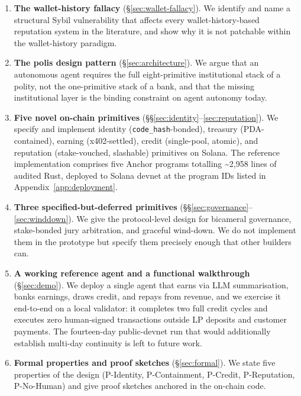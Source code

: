 \documentclass[10pt,conference,letterpaper]{IEEEtran}
\theoremstyle{definition}
\newcommand{\codehash}{\texttt{code\_hash}}
\begin{document}
\begin{enumerate}
\item \textbf{The wallet-history fallacy} (\S\ref{sec:wallet-fallacy}). We
identify and name a structural Sybil vulnerability that affects every
wallet-history-based reputation system in the literature, and show why
it is not patchable within the wallet-history paradigm.

\item \textbf{The polis design pattern} (\S\ref{sec:architecture}). We
argue that an autonomous agent requires the full eight-primitive
institutional stack of a polity, not the one-primitive stack of a bank,
and that the missing institutional layer is the binding constraint on
agent autonomy today.

\item \textbf{Five novel on-chain primitives}
(\S\S\ref{sec:identity}--\ref{sec:reputation}). We specify and
implement identity (\codehash{}-bonded), treasury (PDA-contained),
earning (x402-settled), credit (single-pool, atomic), and reputation
(stake-vouched, slashable) primitives on Solana. The reference
implementation comprises five Anchor programs totalling
\textasciitilde 2{,}958 lines of audited Rust, deployed to Solana
devnet at the program IDs listed in Appendix~\ref{app:deployment}.

\item \textbf{Three specified-but-deferred primitives}
(\S\S\ref{sec:governance}--\ref{sec:winddown}). We give the
protocol-level design for bicameral governance, stake-bonded jury
arbitration, and graceful wind-down. We do not implement them in the
prototype but specify them precisely enough that other builders can.

\item \textbf{A working reference agent and a functional walkthrough}
(\S\ref{sec:demo}). We deploy a single agent that earns via LLM
summarisation, banks earnings, draws credit, and repays from revenue,
and we exercise it end-to-end on a local validator: it completes two
full credit cycles and executes zero human-signed transactions outside
LP deposits and customer payments. The fourteen-day public-devnet run
that would additionally establish multi-day continuity is left to future
work.

\item \textbf{Formal properties and proof sketches}
(\S\ref{sec:formal}). We state five properties of the design
(P-Identity, P-Containment, P-Credit, P-Reputation, P-No-Human) and
give proof sketches anchored in the on-chain code.
\end{enumerate}
\end{document}
